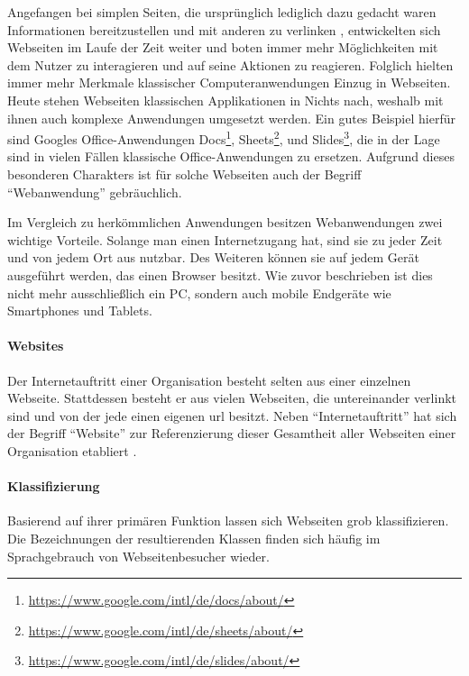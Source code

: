         Angefangen bei simplen Seiten,
        die ursprünglich lediglich dazu gedacht waren Informationen
        bereitzustellen und mit anderen zu
        verlinken \cite{bernersLee:InformationManagement},
        entwickelten sich Webseiten im Laufe der Zeit weiter
        und boten immer mehr Möglichkeiten mit dem Nutzer zu interagieren
        und auf seine Aktionen zu reagieren.
        Folglich hielten immer mehr Merkmale klassischer Computeranwendungen
        Einzug in Webseiten.
        Heute stehen Webseiten klassischen Applikationen in Nichts nach,
        weshalb mit ihnen auch komplexe Anwendungen umgesetzt werden.
        Ein gutes Beispiel hierfür sind Googles Office-Anwendungen
        Docs\footnote{\url{https://www.google.com/intl/de/docs/about/}},
        Sheets\footnote{\url{https://www.google.com/intl/de/sheets/about/}},
        und Slides\footnote{\url{https://www.google.com/intl/de/slides/about/}},
        die in der Lage sind in vielen Fällen klassische Office-Anwendungen zu ersetzen.
        Aufgrund dieses besonderen Charakters ist für solche Webseiten auch der Begriff
        "`Webanwendung"' gebräuchlich.

        Im Vergleich zu herkömmlichen Anwendungen besitzen Webanwendungen zwei wichtige Vorteile.
        Solange man einen Internetzugang hat, sind sie zu jeder Zeit und von jedem Ort aus nutzbar.
        Des Weiteren können sie auf jedem Gerät ausgeführt werden,
        das einen Browser besitzt. Wie zuvor beschrieben ist dies nicht mehr ausschließlich ein PC,
        sondern auch mobile Endgeräte wie Smartphones und Tablets.

        \paragraph*{Websites}
        Der Internetauftritt einer Organisation besteht selten aus einer
        einzelnen Webseite.
        Stattdessen besteht er aus vielen Webseiten,
        die untereinander verlinkt sind und von der jede einen eigenen
        \gls{url} besitzt.
        Neben "`Internetauftritt"' hat sich der Begriff "`Website"' zur
        Referenzierung dieser Gesamtheit aller Webseiten einer Organisation
        etabliert \cite{duden:Internetauftritt, oxford:Website}.

        \paragraph*{Klassifizierung}
        Basierend auf ihrer primären Funktion lassen sich Webseiten grob klassifizieren.
        Die Bezeichnungen der resultierenden Klassen finden sich häufig im Sprachgebrauch
        von Webseitenbesucher wieder.

